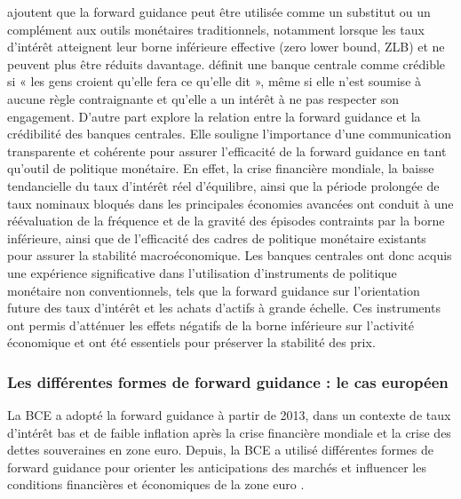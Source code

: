 \citep{blinder2017} ajoutent que la forward guidance peut être utilisée comme un substitut ou un complément aux outils monétaires traditionnels, notamment lorsque les taux d’intérêt atteignent leur borne inférieure effective (zero lower bound, ZLB) et ne peuvent plus être réduits davantage. \citep{blinder2000} définit une banque centrale comme crédible si « les gens croient qu’elle fera ce qu’elle dit », même si elle n’est soumise à aucune règle contraignante et qu’elle a un intérêt à ne pas respecter son engagement. D'autre part \citep{linta2024} explore la relation entre la forward guidance et la crédibilité des banques centrales. Elle souligne l'importance d'une communication transparente et cohérente pour assurer l'efficacité de la forward guidance en tant qu'outil de politique monétaire. En effet, la crise financière mondiale, la baisse tendancielle du taux d’intérêt réel d’équilibre, ainsi que la période prolongée de taux nominaux bloqués dans les principales économies avancées ont conduit à une réévaluation de la fréquence et de la gravité des épisodes contraints par la borne inférieure, ainsi que de l’efficacité des cadres de politique monétaire existants pour assurer la stabilité macroéconomique. Les banques centrales ont donc acquis une expérience significative dans l’utilisation d’instruments de politique monétaire non conventionnels, tels que la forward guidance sur l’orientation future des taux d’intérêt et les achats d’actifs à grande échelle. Ces instruments ont permis d’atténuer les effets négatifs de la borne inférieure sur l’activité économique et ont été essentiels pour préserver la stabilité des prix. 

\subsubsection{Les différentes formes de forward guidance : le cas européen}

La BCE a adopté la forward guidance à partir de 2013, dans un contexte de taux d’intérêt bas et de faible inflation après la crise financière mondiale et la crise des dettes souveraines en zone euro. Depuis, la BCE a utilisé différentes formes de forward guidance pour orienter les anticipations des marchés et influencer les conditions financières et économiques de la zone euro \citep{hofmann2024ecb}.\\


